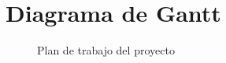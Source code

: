 \section{Diagrama de Gantt}

\begin{figure}[htbp!]
	\begin{center}
		\caption{Plan de trabajo del proyecto}
		\label{fig:plan}
	\end{center}
\end{figure}


